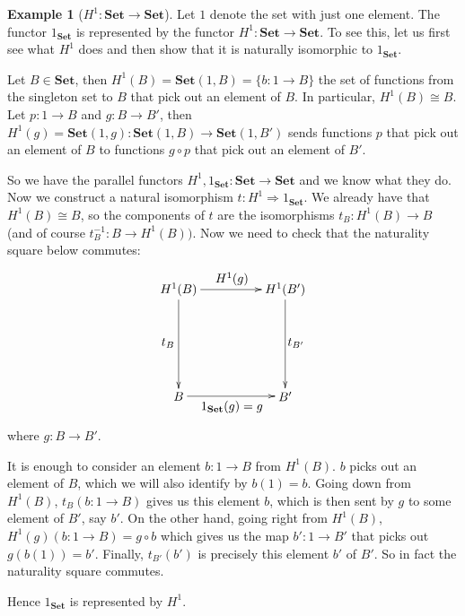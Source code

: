 \documentclass[11pt]{article}
\theoremstyle{definition}
\theoremstyle{definition}
\newtheorem{ex}{Example}
\theoremstyle{plain}
\theoremstyle{plain}
\theoremstyle{plain}
\begin{document}
\begin{ex}[$H^{1}:\textbf{Set} \to \textbf{Set}$]
Let $1$ denote the set with just one element. The functor $1_{\textbf{Set}}$ is represented by the functor $H^{1}:\textbf{Set} \to \textbf{Set}$. To see this, let us first see what $H^{1}$ does and then show that it is naturally isomorphic to $1_{\textbf{Set}}$.

Let $B \in \textbf{Set}$, then $H^{1}(B) = \textbf{Set}(1, B) = \{  b:1 \to B \}$ the set of functions from the singleton set to $B$ that pick out an element of $B$. In particular, $H^{1}(B) \cong B$. Let $p: 1 \to B$ and $g: B \to B'$, then $H^{1}(g) = \textbf{Set}(1, g): \textbf{Set}(1, B) \to \textbf{Set}(1, B')$ sends functions $p$ that pick out an element of $B$ to functions $g \circ p$ that pick out an element of $B'$.

So we have the parallel functors $H^{1}, 1_{\textbf{Set}}: \textbf{Set} \to \textbf{Set}$ and we know what they do. Now we construct a natural isomorphism $t: H^{1} \Rightarrow 1_{\textbf{Set}}$. We already have that $H^{1}(B) \cong B$, so the components of $t$ are the isomorphisms $t_{B}: H^{1}(B) \to B$ (and of course $t^{-1}_{B}: B \to H^{1}(B))$. Now we need to check that the naturality square below commutes:

\begin{equation*}
\begin{xy}
(0, 0)*+{H^{1}(B)}="h1b"; (30, 0)*+{H^{1}(B')}="h1bp"; (0, -30)*+{B}="b"; (30, -30)*+{B'}="bp";
{\ar "h1b";"h1bp"}?*!/_3mm/{H^{1}(g)}; {\ar "b";"bp"}?*!/^3mm/{1_{\textbf{Set}}(g)=g};
{\ar "h1b";"b"}?*!/^3mm/{t_{B}}; {\ar "h1bp";"bp"}?*!/_3mm/{t_{B'}};
\end{xy}
\end{equation*}

where $g: B \to B'$.

It is enough to consider an element $b: 1 \to B$ from $H^{1}(B)$. $b$ picks out an element of $B$, which we will also identify by $b(1) = b$. Going down from $H^{1}(B)$, $t_{B}(b: 1 \to B)$ gives us this element $b$, which is then sent by $g$ to some element of $B'$, say $b'$. On the other hand, going right from $H^{1}(B)$, $H^{1}(g)(b: 1 \to B) = g \circ b$ which gives us the map $b': 1 \to B'$ that picks out $g(b(1)) = b'$. Finally, $t_{B'}(b')$ is precisely this element $b'$ of $B'$. So in fact the naturality square commutes.

Hence $1_{\textbf{Set}}$ is represented by $H^{1}$.
\end{ex}
\end{document}
